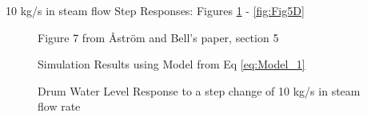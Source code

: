         10 kg/s in steam flow Step Responses: Figures \ref{fig:Fig7A} - \ref{fig:Fig5D}
        \begin{figure}[ht]
            \begin{center}
                
                Figure 7 from \r{A}str\"{o}m and Bell's paper, section 5 \cite{Astrom}
                
                
                Simulation Results using Model from Eq \eqref{eq:Model_1}
                
                \caption{Drum Water Level Response to a step change of 10 kg/s in steam flow rate}
                \label{fig:Fig7A}
            \end{center}
        \end{figure}  %
